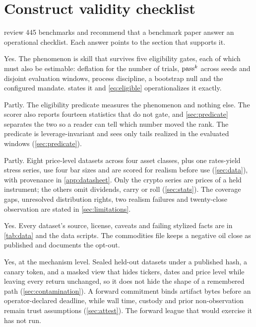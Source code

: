 \section{Construct validity checklist}\label{app:checklist}

\citet{constructvalidity2025} review 445 benchmarks and recommend that a benchmark paper answer an operational checklist. Each answer points to the section that supports it.

\begin{description}[style=nextline,leftmargin=0pt,labelwidth=0pt,labelsep=0pt,itemindent=0pt,itemsep=3pt]
\item[Define the phenomenon.] Yes. The phenomenon is skill that survives five eligibility gates, each of which must also be estimable: deflation for the number of trials, $\text{pass}^{k}$ across seeds and disjoint evaluation windows, process discipline, a bootstrap null and the configured mandate.  states it and \cref{eq:eligible} operationalizes it exactly.
\item[Measure only the phenomenon.] Partly. The eligibility predicate measures the phenomenon and nothing else. The scorer also reports fourteen statistics that do not gate, and \cref{sec:predicate} separates the two so a reader can tell which number moved the rank. The predicate is leverage-invariant and sees only tails realized in the evaluated windows (\cref{sec:predicate}).
\item[Construct representative datasets.] Partly. Eight price-level datasets across four asset classes, plus one rates-yield stress series, use four bar sizes and are scored for realism before use (\cref{sec:data}), with provenance in \cref{app:datasheet}. Only the crypto series are prices of a held instrument; the others omit dividends, carry or roll (\cref{sec:stats}). The coverage gaps, unresolved distribution rights, two realism failures and twenty-close observation are stated in \cref{sec:limitations}.
\item[Acknowledge limitations of reused datasets.] Yes. Every dataset's source, license, caveats and failing stylized facts are in \cref{tab:data} and the data scripts. The commodities file keeps a negative oil close as published and documents the opt-out.
\item[Prepare for contamination.] Yes, at the mechanism level. Sealed held-out datasets under a published hash, a canary token, and a masked view that hides tickers, dates and price level while leaving every return unchanged, so it does not hide the shape of a remembered path (\cref{sec:contamination}). A forward commitment binds artifact bytes before an operator-declared deadline, while wall time, custody and prior non-observation remain trust assumptions (\cref{sec:attest}). The forward league that would exercise it has not run.

\end{description}
